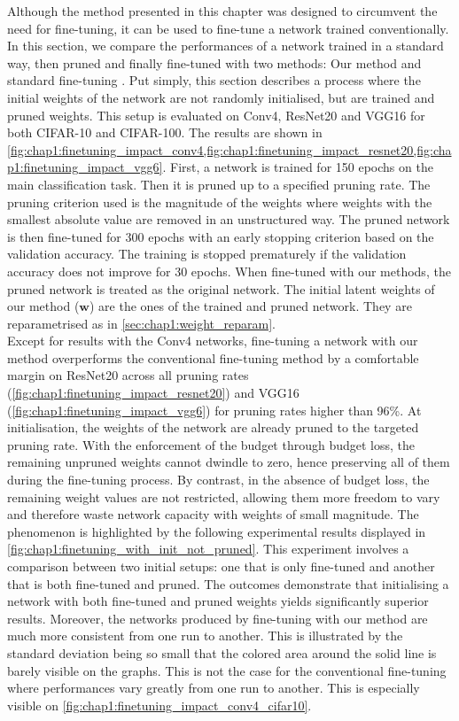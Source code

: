 Although the method presented in this chapter was designed to circumvent the
need for fine-tuning, it can be used to fine-tune a network trained
conventionally. In this section, we compare the performances of a network
trained in a standard way, then pruned and finally fine-tuned with two methods:
Our method and standard fine-tuning \cite{DBLP:conf/nips/HanPTD15}. Put simply,
this section describes a process where the initial weights of the network are
not randomly initialised, but are trained and pruned weights. This setup is
evaluated on Conv4, ResNet20 and VGG16 for both CIFAR-10 and CIFAR-100. The
results are shown in
\cref{fig:chap1:finetuning_impact_conv4,fig:chap1:finetuning_impact_resnet20,fig:chap1:finetuning_impact_vgg6}.
First, a network is trained for 150 epochs on the main classification task. Then
it is pruned up to a specified pruning rate. The pruning criterion used is the
magnitude of the weights where weights with the smallest absolute value are
removed in an unstructured way. The pruned network is then fine-tuned for 300
epochs with an early stopping criterion based on the validation accuracy. The
training is stopped prematurely if the validation accuracy does not improve for
30 epochs. When fine-tuned with our methods, the pruned network is treated as
the original network. The initial latent weights of our method ($\mathbf{w}$)
are the ones of the trained and pruned network. They are reparametrised as in
\ref{sec:chap1:weight_reparam}.\\

Except for results with the Conv4 networks, fine-tuning a network with our
method overperforms the conventional fine-tuning method by a comfortable margin
on ResNet20 across all pruning rates
(\cref{fig:chap1:finetuning_impact_resnet20}) and VGG16
(\cref{fig:chap1:finetuning_impact_vgg6}) for pruning rates higher than 96\%. At
initialisation, the weights of the network are already pruned to the targeted
pruning rate. With the enforcement of the budget through budget loss, the
remaining unpruned weights cannot dwindle to zero, hence preserving all of them
during the fine-tuning process. By contrast, in the absence of budget loss, the
remaining weight values are not restricted, allowing them more freedom to vary
and therefore waste network capacity with weights of small magnitude. The
phenomenon is highlighted by the following experimental results displayed in
\cref{fig:chap1:finetuning_with_init_not_pruned}. This experiment involves a
comparison between two initial setups: one that is only fine-tuned and another
that is both fine-tuned and pruned. The outcomes demonstrate that initialising a
network with both fine-tuned and pruned weights yields significantly superior
results. Moreover, the networks produced by fine-tuning with our method are much
more consistent from one run to another. This is illustrated by the standard
deviation being so small that the colored area around the solid line is barely
visible on the graphs. This is not the case for the conventional fine-tuning
where performances vary greatly from one run to another. This is especially
visible on \cref{fig:chap1:finetuning_impact_conv4_cifar10}.\\

